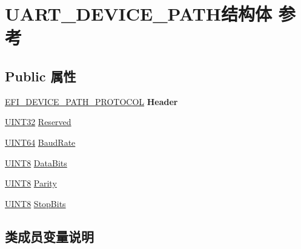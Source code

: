 \hypertarget{struct_u_a_r_t___d_e_v_i_c_e___p_a_t_h}{}\section{U\+A\+R\+T\+\_\+\+D\+E\+V\+I\+C\+E\+\_\+\+P\+A\+T\+H结构体 参考}
\label{struct_u_a_r_t___d_e_v_i_c_e___p_a_t_h}
\subsection*{Public 属性}
\begin{DoxyCompactItemize}
\item 
\mbox{\label{struct_u_a_r_t___d_e_v_i_c_e___p_a_t_h_a764681f2e388553d32103b2e2ec2b8fb}} 
\hyperlink{struct_e_f_i___d_e_v_i_c_e___p_a_t_h___p_r_o_t_o_c_o_l}{E\+F\+I\+\_\+\+D\+E\+V\+I\+C\+E\+\_\+\+P\+A\+T\+H\+\_\+\+P\+R\+O\+T\+O\+C\+OL} {\bfseries Header}
\item 
\hyperlink{_processor_bind_8h_ae1e6edbbc26d6fbc71a90190d0266018}{U\+I\+N\+T32} \hyperlink{struct_u_a_r_t___d_e_v_i_c_e___p_a_t_h_a66b9731e1247fe368306effc2c89eb27}{Reserved}
\item 
\hyperlink{_processor_bind_8h_a57be03562867144161c1bfee95ca8f7c}{U\+I\+N\+T64} \hyperlink{struct_u_a_r_t___d_e_v_i_c_e___p_a_t_h_a68074c01c790ca77e1e3659bca9c9db4}{Baud\+Rate}
\item 
\hyperlink{_processor_bind_8h_ab27e9918b538ce9d8ca692479b375b6a}{U\+I\+N\+T8} \hyperlink{struct_u_a_r_t___d_e_v_i_c_e___p_a_t_h_af8341dcf3a4ce851715773aeb46b7a5b}{Data\+Bits}
\item 
\hyperlink{_processor_bind_8h_ab27e9918b538ce9d8ca692479b375b6a}{U\+I\+N\+T8} \hyperlink{struct_u_a_r_t___d_e_v_i_c_e___p_a_t_h_a9cdb88d8b78fd7cbcfae57fbb077ed91}{Parity}
\item 
\hyperlink{_processor_bind_8h_ab27e9918b538ce9d8ca692479b375b6a}{U\+I\+N\+T8} \hyperlink{struct_u_a_r_t___d_e_v_i_c_e___p_a_t_h_a29936123a70606870cf91df5866c40dd}{Stop\+Bits}
\end{DoxyCompactItemize}


\subsection{类成员变量说明}
\mbox{\label{struct_u_a_r_t___d_e_v_i_c_e___p_a_t_h_a68074c01c790ca77e1e3659bca9c9db4}} 
